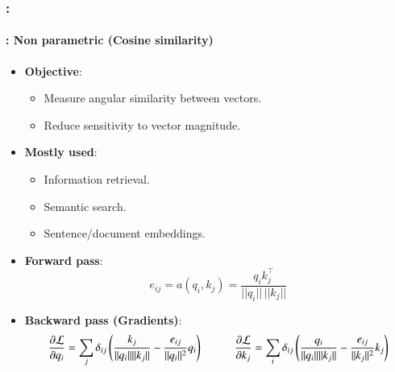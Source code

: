 \documentclass[xcolor=table]{beamer}
\begin{document}
	\begin{frame}
		\frametitle{\insertshortsubtitle: \insertsection}
		\framesubtitle{\insertsubsection: Non parametric (Cosine similarity)}
		
		\begin{itemize}
			\item \textbf{Objective}:
			\begin{itemize}
				\item Measure angular similarity between vectors.
				\item Reduce sensitivity to vector magnitude.
			\end{itemize}
			
			\item \textbf{Mostly used}:
			\begin{itemize}
				\item Information retrieval.
				\item Semantic search.
				\item Sentence/document embeddings.
			\end{itemize}
			
			\item \textbf{Forward pass}:
			\[
			e_{ij} = a(q_i, k_j) = \frac{q_i k_j^\top}{||q_i|| \, ||k_j||}
			\]
			
			\item \textbf{Backward pass (Gradients)}:
			\[
			\frac{\partial \mathcal{L}}{\partial q_i}
			=
			\sum_j \delta_{ij} \left( \frac{k_j}{||q_i|| ||k_j||} - \frac{e_{ij}}{||q_i||^2} q_i \right)
			\hskip1cm
			\frac{\partial \mathcal{L}}{\partial k_j}
			=
			\sum_i \delta_{ij} \left( \frac{q_i}{||q_i|| ||k_j||} - \frac{e_{ij}}{||k_j||^2} k_j \right)
			\]
			
		\end{itemize}
		
	\end{frame}
	
\end{document}
